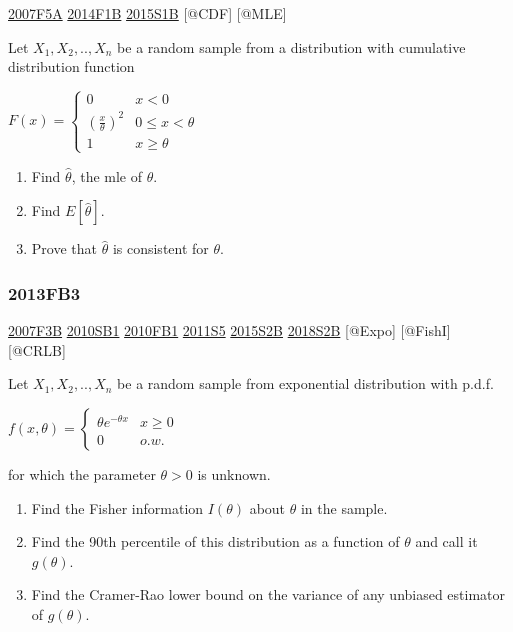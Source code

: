 \documentclass[6pt,twocolumn,Portrait]{article}
\begin{document}
\protect\hyperlink{f5a}{2007F5A} \protect\hyperlink{f1b-1}{2014F1B}
\protect\hyperlink{s1b-1}{2015S1B} {[}@CDF{]} {[}@MLE{]}

Let \(X_1,X_2,..,X_n\) be a random sample from a distribution with
cumulative distribution function

\(F(x)=\begin{cases}0&x<0\\(\frac{x}\theta)^2& 0\le x<\theta\\1& x\ge\theta\end{cases}\)

\begin{enumerate}
\def\labelenumi{(\alph{enumi})}
\item
  Find \(\hat\theta\), the mle of \(\theta\).
\item
  Find \(E[\hat\theta]\).
\item
  Prove that \(\hat\theta\) is consistent for \(\theta\).
\end{enumerate}

\hypertarget{fb3-2}{%
\subsubsection{2013FB3}\label{fb3-2}}

\protect\hyperlink{f3b}{2007F3B} \protect\hyperlink{sb1-1}{2010SB1}
\protect\hyperlink{fb1-1}{2010FB1} \protect\hyperlink{s5-2}{2011S5}
\protect\hyperlink{s2b-1}{2015S2B} \protect\hyperlink{s2b-2}{2018S2B}
{[}@Expo{]} {[}@FishI{]} {[}@CRLB{]}

Let \(X_1,X_2,..,X_n\) be a random sample from exponential distribution
with p.d.f.

\(f(x,\theta)=\begin{cases}\theta e^{-\theta x}& x\ge0\\0& o.w.\end{cases}\)

for which the parameter \(\theta>0\) is unknown.

\begin{enumerate}
\def\labelenumi{(\alph{enumi})}
\item
  Find the Fisher information \(I(\theta)\) about \(\theta\) in the
  sample.
\item
  Find the 90th percentile of this distribution as a function of
  \(\theta\) and call it \(g(\theta)\).
\item
  Find the Cramer-Rao lower bound on the variance of any unbiased
  estimator of \(g(\theta)\).
\end{enumerate}
\end{document}
